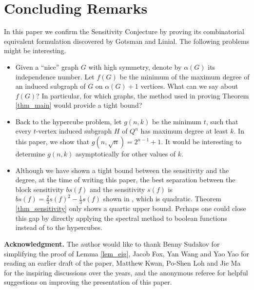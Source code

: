 \documentclass[12pt]{article}
\theoremstyle{plain}
\theoremstyle{definition}
\begin{document}
\section{Concluding Remarks}
In this paper we confirm the Sensitivity Conjecture by proving its combinatorial equivalent formulation discovered by Gotsman and Linial. The following problems might be interesting.

\begin{itemize}
\item Given a ``nice'' graph $G$ with high symmetry, denote by $\alpha(G)$ its independence number. Let $f(G)$ be the minimum of the maximum degree of an induced subgraph of $G$ on $\alpha(G)+1$ vertices. What can we say about $f(G)$? In particular, for which graphs, the method used in proving Theorem \ref{thm_main} would provide a tight bound? 

\item Back to the hypercube problem, let $g(n, k)$ be the minimum $t$, such that every $t$-vertex induced subgraph $H$ of $Q^n$ has maximum degree at least $k$. In this paper, we show that $g(n, \sqrt{n}) = 2^{n-1}+1$. It would be interesting to determine $g(n, k)$ asymptotically for other values of $k$.

\item Although we have shown a tight bound between the sensitivity and the degree, at the time of writing this paper, the best separation between the block sensitivity $bs(f)$ and the sensitivity $s(f)$ is $bs(f)=\frac{2}{3}s(f)^2-\frac{1}{3}s(f)$ shown in \cite{ambainis-sun}, which is quadratic. Theorem \ref{thm_sensitivity} only shows a quartic upper bound. Perhaps one could close this gap by directly applying the spectral method to boolean functions instead of to the hypercubes.
\end{itemize}

\noindent \textbf{Acknowledgment. }The author would like to thank Benny Sudakov for simplifying the proof of Lemma \ref{lem_eig}, Jacob Fox, Yan Wang and Yao Yao for reading an earlier draft of the paper, Matthew Kwan, Po-Shen Loh and Jie Ma for the inspiring discussions over the years, and the anonymous referee for helpful suggestions on improving the presentation of this paper.
\end{document}
